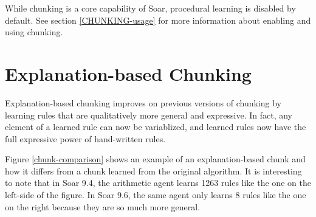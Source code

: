 While chunking is a core capability of Soar, procedural learning is disabled by default.  See section \ref{CHUNKING-usage} for more information about enabling and using chunking.

\section{Explanation-based Chunking}

Explanation-based chunking improves on previous versions of chunking by learning rules that are qualitatively more general and expressive.  In fact, any element of a learned rule can now be variablized, and learned rules now have the full expressive power of hand-written rules. 

Figure \ref{chunk-comparison} shows an example of an explanation-based chunk and how it differs from a chunk learned from the original algorithm.  It is interesting to note that in Soar 9.4, the arithmetic agent learns 1263 rules like the one on the left-side of the figure.  In Soar 9.6, the same agent only learns 8 rules like the one on the right because they are so much more general.

